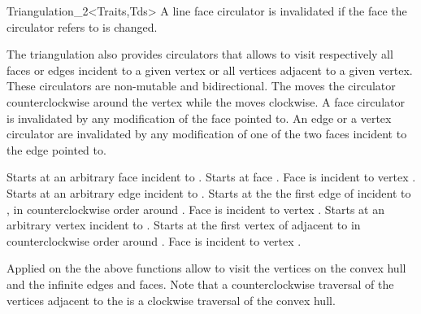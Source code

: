 \begin{ccRefClass}{Triangulation_2<Traits,Tds>}
A line face circulator is invalidated if the face the circulator refers
to is changed.

\ccThreeToTwo




The triangulation also provides circulators that allows to visit 
respectively all faces or edges incident to a given vertex
or all vertices adjacent to a given vertex.
These circulators are
non-mutable
and bidirectional.
 The  moves the circulator
counterclockwise around the vertex while
the  moves clockwise.
A face circulator is invalidated by any modification of the face pointed to.
An edge or a vertex circulator are invalidated by any modification
of one of the two faces incident to the edge pointed to.

{Starts at an arbitrary face incident
to .}
\ccGlue
{}
{Starts at face .
\ccPrecond Face  is incident to vertex .}
\ccGlue
{}
{Starts at an arbitrary edge incident
to .}
\ccGlue
{}
{Starts at the the first edge of  incident to 
, in counterclockwise order around .
\ccPrecond Face  is incident to vertex .}
\ccGlue
{}
{Starts at an arbitrary  vertex incident
to .}
\ccGlue
{}
{Starts at the first vertex of  adjacent  to 
in  counterclockwise order around .
\ccPrecond Face  is incident to vertex .}





Applied on the 
the above  functions  allow to visit the vertices on the convex hull and
the infinite edges and faces. Note that a counterclockwise
traversal of the vertices adjacent to the  is
a clockwise traversal of the convex hull.

\ccGlue
{}
\ccGlue
{}
\ccGlue
{}
\ccGlue
{} {}
\ccGlue
{}




\end{ccRefClass}
